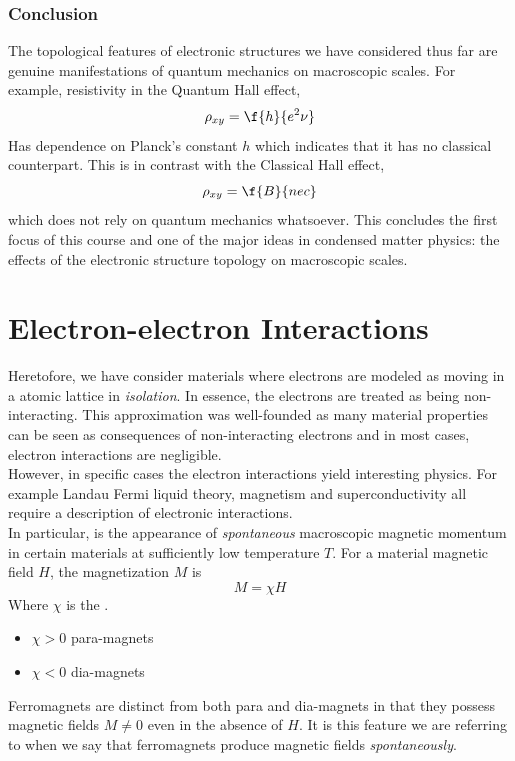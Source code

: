 \documentclass{article}
\begin{document}
\subsubsection{Conclusion}

The topological features of electronic structures we have considered thus far are genuine manifestations of quantum mechanics on macroscopic scales. For example, resistivity in the Quantum Hall effect,
\[ \rho_{xy} = \f{h}{e^2 \nu} \]
Has dependence on Planck's constant $h$ which indicates that it has no classical counterpart. This is in contrast with the Classical Hall effect,
\[ \rho_{xy} = \f{B}{nec} \]
which does not rely on quantum mechanics whatsoever. This concludes the first focus of this course and one of the major ideas in condensed matter physics: the effects of the electronic structure topology on macroscopic scales. \\

\section{Electron-electron Interactions}

Heretofore, we have consider materials where electrons are modeled as moving in a atomic lattice in \textit{isolation}. In essence, the electrons are treated as being non-interacting. This approximation was well-founded as many material properties can be seen as consequences of non-interacting electrons and in most cases, electron interactions are negligible. \\

However, in specific cases the electron interactions yield interesting physics. For example Landau Fermi liquid theory, magnetism and superconductivity all require a description of electronic interactions. \\

In particular,  is the appearance of \textit{spontaneous} macroscopic magnetic momentum in certain materials at sufficiently low temperature $T$. For a material magnetic field $H$, the magnetization $M$ is
\[ M = \chi H \]
Where $\chi$ is the .
\begin{itemize}
    \item $\chi > 0$ para-magnets
    \item $\chi < 0$ dia-magnets
\end{itemize}
Ferromagnets are distinct from both para and dia-magnets in that they possess magnetic fields $M \neq 0$ even in the absence of $H$. It is this feature we are referring to when we say that ferromagnets produce magnetic fields \textit{spontaneously}. \\
\end{document}

